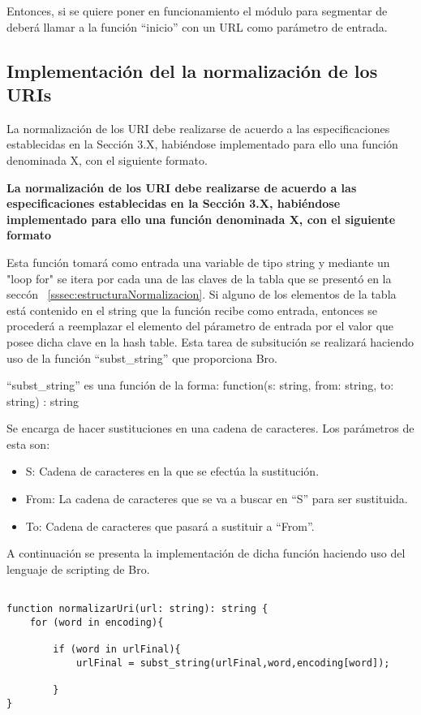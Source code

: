     Entonces, si se quiere poner en funcionamiento el módulo para segmentar de deberá llamar a la función “inicio” con un URL como parámetro de entrada.

\subsection{Implementación del la normalización de los URIs}\label{subsec:implementacionNorm}

La normalización de los URI debe realizarse de acuerdo a las especificaciones establecidas en la Sección 3.X, habiéndose implementado para ello una función denominada X, con el siguiente formato.

\textbf{La normalización de los URI debe realizarse de acuerdo a las especificaciones establecidas en la Sección 3.X, habiéndose implementado para ello una función denominada X, con el siguiente formato}

Esta función tomará como entrada una variable de tipo string y mediante un "loop for" se itera por cada una de las claves de la tabla que se presentó en la seccón ~\ref{sssec:estructuraNormalizacion}. Si alguno de los elementos de la tabla está contenido en el string que la función recibe como entrada, entonces se procederá a reemplazar el elemento del párametro de entrada por el valor que posee dicha clave en la hash table. Esta tarea de subsitución se realizará haciendo uso de la función “subst\_string” que proporciona Bro.

“subst\_string” es una función de la forma: function(s: string, from: string, to: string) : string

Se encarga de hacer sustituciones en una cadena de caracteres. Los parámetros de esta son:

\begin{itemize}
\item S: Cadena de caracteres en la que se efectúa la sustitución.
\item From: La cadena de caracteres que se va a buscar en “S” para ser sustituida.
\item To: Cadena de caracteres que pasará a sustituir a “From”.
\end{itemize}

A continuación se presenta la implementación de dicha función haciendo uso del lenguaje de scripting de Bro.

\begin{verbatim}

function normalizarUri(url: string): string {
    for (word in encoding){

        if (word in urlFinal){
            urlFinal = subst_string(urlFinal,word,encoding[word]);

        }
}
\end{verbatim}


